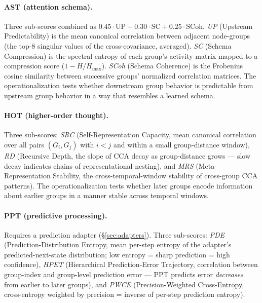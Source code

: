 \documentclass[11pt,a4paper]{article}
\begin{document}
\paragraph{AST (attention schema).} Three sub-scores combined as $0.45 \cdot \text{UP} + 0.30 \cdot \text{SC} + 0.25 \cdot \text{SCoh}$. \emph{UP} (Upstream Predictability) is the mean canonical correlation between adjacent node-groups (the top-8 singular values of the cross-covariance, averaged). \emph{SC} (Schema Compression) is the spectral entropy of each group's activity matrix mapped to a compression score ($1 - H / H_{\max}$). \emph{SCoh} (Schema Coherence) is the Frobenius cosine similarity between successive groups' normalized correlation matrices. The operationalization tests whether downstream group behavior is predictable from upstream group behavior in a way that resembles a learned schema.

\paragraph{HOT (higher-order thought).} Three sub-scores: \emph{SRC} (Self-Representation Capacity, mean canonical correlation over all pairs $(G_i, G_j)$ with $i < j$ and within a small group-distance window), \emph{RD} (Recursive Depth, the slope of CCA decay as group-distance grows --- slow decay indicates chains of representational nesting), and \emph{MRS} (Meta-Representation Stability, the cross-temporal-window stability of cross-group CCA patterns). The operationalization tests whether later groups encode information about earlier groups in a manner stable across temporal windows.

\paragraph{PPT (predictive processing).} Requires a prediction adapter (\S\ref{sec:adapters}). Three sub-scores: \emph{PDE} (Prediction-Distribution Entropy, mean per-step entropy of the adapter's predicted-next-state distribution; low entropy = sharp prediction = high confidence), \emph{HPET} (Hierarchical Prediction-Error Trajectory, correlation between group-index and group-level prediction error --- PPT predicts error \emph{decreases} from earlier to later groups), and \emph{PWCE} (Precision-Weighted Cross-Entropy, cross-entropy weighted by precision = inverse of per-step prediction entropy).
\end{document}
